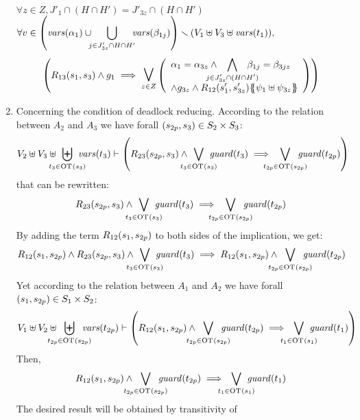 \documentclass[runningheads]{llncs}
\begin{document}
\begin{enumerate}
$\forall z \in Z,  J'_1 \cap (H \cap H') = J'_{3z} \cap (H\cap H')$\\
$\displaystyle {\forall v \in {\left(\mathit{vars}{\left(\alpha_{1}\right)}  \cup\!\!\! \bigcup_{j \in J'_{3z} \cap H \cap H'} \!\!\!\mathit{vars}{\left(\beta_{1j} \right)} \right)} \smallsetminus{\left(V_1 \uplus  V_3 \uplus \mathit{vars}{\left(t_1\right)}\right)}} ,  $
\begin{align*}
\mpar{R_{13}\mpar{s_1, s_3} \wedge g_1 \implies 
\operatorname*{\bigsymb{\bigvee}}_{z \in Z}
\mpar{\everymath{\displaystyle}
\begin{array}{l}
\alpha_1=\alpha_{3z}\wedge \bigwedge_\subbox{j \in J'_{3z} \cap (H\cap H')} \beta_{1j}=\beta_{3jz}\\ \wedge g_{3z}\wedge 
{R_{12}\mpar{s'_1,s'_{3z}}}\psubst{\psi_1  \uplus \psi_{3z}}
\end{array}}}
\end{align*}	
\medskip
\item Concerning the condition of deadlock reducing. According to the relation between   $A_2$ and $A_3$ we have forall ${\left(s_{2p}, s_3\right)} \in S_2 \times S_3$:
\begin{multline*}
 V_2 \uplus V_3 \uplus \biguplus_\subbox{t_3 \in \fOT{s_3}} \fvars{t_3} \vdash \left(R_{23}\mpar{s_{2p}, s_3} \wedge \bigvee_\subbox{t_3 \in \fOT{s_3}} \fguard{t_3} \implies \bigvee_\subbox{t_{2p} \in \fOT{s_{2p}}} \fguard{t_{2p}} \right)
\end{multline*}
that can be rewritten:
\begin{align*}
R_{23}\mpar{s_{2p}, s_3} \wedge \bigvee_\subbox{t_3 \in \fOT{s_3}} \fguard{t_3} \implies \bigvee_\subbox{t_{2p} \in \fOT{s_{2p}}} \fguard{t_{2p}} 
\end{align*}
By adding the term $R_{12}{\left(s_1,s_{2p}\right)}$ to both sides of the implication, we get:
\begin{align*}
R_{12}\mpar{s_1,s_{2p}}\wedge R_{23}\mpar{s_{2p}, s_3} \wedge \bigvee_\subbox{t_3 \in \fOT{s_3}} \fguard{t_3} \implies R_{12}\mpar{s_1,s_{2p}}\wedge \bigvee_\subbox{t_{2p} \in \fOT{s_{2p}}} \fguard{t_{2p}} 
\end{align*}
Yet according to the relation between $A_1$ and $A_2$ we have  forall ${\left(s_1, s_{2p}\right)} \in S_1 \times S_2$:
\begin{multline*}
 V_1 \uplus V_2 \uplus \biguplus_\subbox{t_{2p} \in \fOT{s_{2p}}} \fvars{t_{2p}} \vdash \left(R_{12}\mpar{s_1, s_{2p}} \wedge \bigvee_\subbox{t_{2p} \in \fOT{s_{2p}}} \fguard{t_{2p}} \implies \bigvee_\subbox{t_1 \in \fOT{s_1}} \fguard{t_1} \right)
\end{multline*}
Then,
\begin{align*}
R_{12}\mpar{s_1, s_{2p}} \wedge \bigvee_\subbox{t_{2p} \in \fOT{s_{2p}}} \fguard{t_{2p}} \implies \bigvee_\subbox{t_1 \in \fOT{s_1}} \fguard{t_1}
\end{align*}
The desired result will be obtained by transitivity of 





\end{enumerate}
\end{document}
